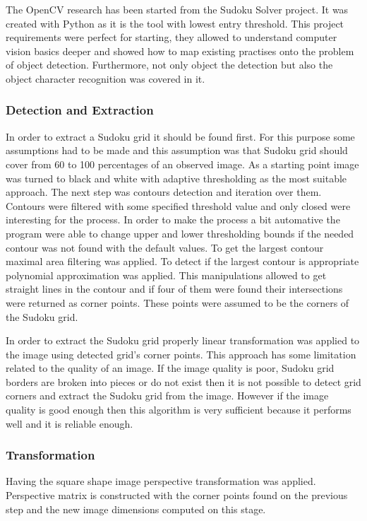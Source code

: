 \documentclass[../../main]{subfiles}
\begin{document}
The \ac{OpenCV} research has been started from the Sudoku Solver project. It was created with Python as it is the tool with lowest entry threshold. This project requirements were perfect for starting, they allowed to understand computer vision basics deeper and showed how to map existing practises onto the problem of object detection. Furthermore, not only object the detection but also the object character recognition was covered in it. 

\subsubsection{Detection and Extraction}

In order to extract a Sudoku grid it should be found first. For this purpose some assumptions had to be made and this assumption was that Sudoku grid should cover from 60 to 100 percentages of an observed image. As a starting point image was turned to black and white with adaptive thresholding as the most suitable approach. The next step was contours detection and iteration over them. Contours were filtered with some specified threshold value and only closed were interesting for the process. In order to make the process a bit automative the program were able to change upper and lower thresholding bounds if the needed contour was not found with the default values. To get the largest contour maximal area filtering was applied. To detect if the largest contour is appropriate polynomial approximation was applied. This manipulations allowed to get straight lines in the contour and if four of them were found their intersections were returned as corner points. These points were assumed to be the corners of the Sudoku grid.

In order to extract the Sudoku grid properly linear transformation was applied to the image using detected grid's corner points.
This approach has some limitation related to the quality of an image. If the image quality is poor, Sudoku grid borders are broken into pieces or do not exist then it is not possible to detect grid corners and extract the Sudoku grid from the image. However if the image quality is good enough then this algorithm is very sufficient because it performs well and it is reliable enough.

\subsubsection{Transformation}

Having the square shape image perspective transformation was applied. Perspective matrix is constructed with the corner points found on the previous step and the new image dimensions computed on this stage.
\end{document}
